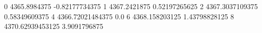 0 4365.8984375 -0.82177734375
1 4367.2421875 0.52197265625
2 4367.3037109375 0.58349609375
4 4366.72021484375 0.0
6 4368.158203125 1.43798828125
8 4370.62939453125 3.9091796875
